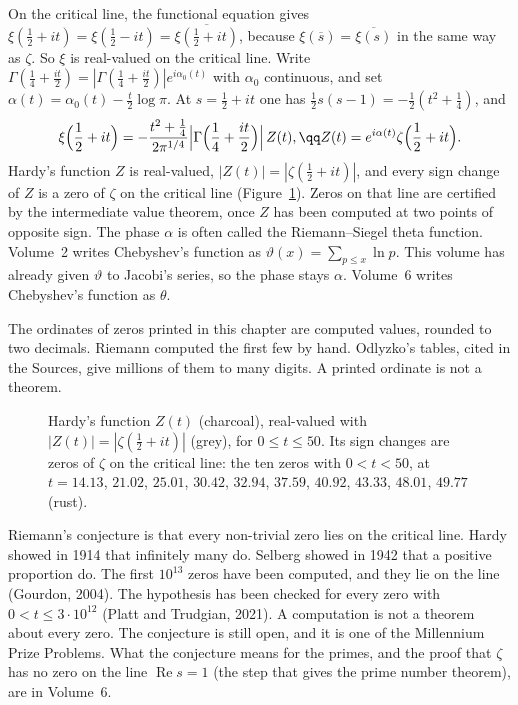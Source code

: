 On the critical line, the functional equation gives $\xi(\frac12+it)=\xi(\frac12-it)=\overline{\xi(\frac12+it)}$, because $\xi(\overline s)=\overline{\xi(s)}$ in the same way as $\zeta$. So $\xi$ is real-valued on the critical line. Write $\Gamma(\frac14+\frac{it}2)=|\Gamma(\frac14+\frac{it}2)|e^{i\alpha_0(t)}$ with $\alpha_0$ continuous, and set $\alpha(t)=\alpha_0(t)-\frac t2\log\pi$. At $s=\frac12+it$ one has $\frac12 s(s-1)=-\frac12(t^2+\frac14)$, and
\[
\begin{gathered}\xi\Bigl(\frac12+it\Bigr)=-\frac{t^2+\frac14}{2\pi^{1/4}}\Bigl|\Gamma\Bigl(\frac14+\frac{it}2\Bigr)\Bigr|\,Z(t),\qq Z(t)=e^{i\alpha(t)}\zeta\Bigl(\frac12+it\Bigr).\end{gathered}
\]
Hardy's function $Z$ is real-valued, $|Z(t)|=|\zeta(\frac12+it)|$, and every sign change of $Z$ is a zero of $\zeta$ on the critical line (Figure~\ref{fig:hardyz}). Zeros on that line are certified by the intermediate value theorem, once $Z$ has been computed at two points of opposite sign. The phase $\alpha$ is often called the Riemann--Siegel theta function. Volume~2 writes Chebyshev's function as $\vartheta(x)=\sum_{p\le x}\ln p$. This volume has already given $\vartheta$ to Jacobi's series, so the phase stays $\alpha$. Volume~6 writes Chebyshev's function as $\theta$.

The ordinates of zeros printed in this chapter are computed values, rounded to two decimals. Riemann computed the first few by hand. Odlyzko's tables, cited in the Sources, give millions of them to many digits. A printed ordinate is not a theorem.

\begin{figure}[ht]
\centering
{}
\caption{Hardy's function $Z(t)$ (charcoal), real-valued with $|Z(t)|=|\zeta(\frac12+it)|$ (grey), for $0\le t\le50$. Its sign changes are zeros of $\zeta$ on the
critical line: the ten zeros with $0<t<50$, at $t=14.13$, $21.02$, $25.01$, $30.42$, $32.94$, $37.59$, $40.92$, $43.33$, $48.01$, $49.77$ (rust).}
\label{fig:hardyz}
\end{figure}

\begin{remark}
Riemann's conjecture is that every non-trivial zero lies on the critical line. Hardy showed in 1914 that infinitely many do. Selberg showed in 1942 that a positive proportion do. The first $10^{13}$ zeros have been computed, and they lie on the line (Gourdon, 2004). The hypothesis has been checked for every zero with $0<t\le3\cdot10^{12}$ (Platt and Trudgian, 2021). A computation is not a theorem about every zero. The conjecture is still open, and it is one of the Millennium Prize Problems. What the conjecture means for the primes, and the proof that $\zeta$ has no zero on the line $\operatorname{Re}s=1$ (the step that gives the prime number theorem), are in Volume~6.
\end{remark}


